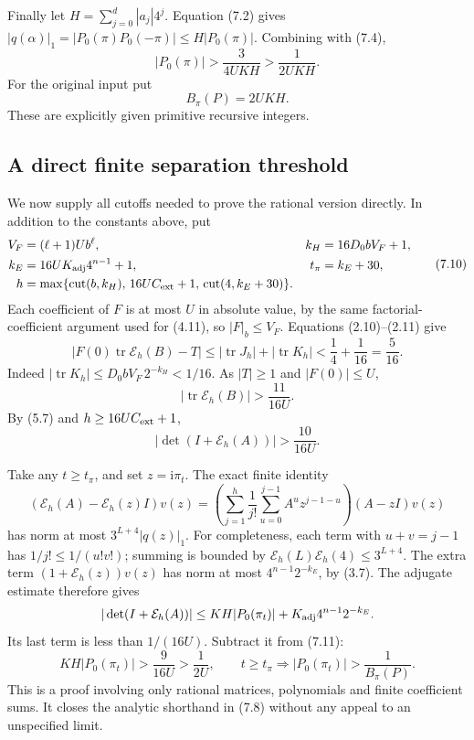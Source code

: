 \documentclass[11pt]{article}
\theoremstyle{definition}
\newcommand{\ii}{\mathrm i}
\newcommand{\tr}{\operatorname{tr}}
\newcommand{\Exp}{\mathcal E}
\newcommand{\cut}{\operatorname{cut}}
\begin{document}
Finally let \(H=\sum_{j=0}^d|a_j|4^j\).
Equation (7.2) gives
\(|q(\alpha)|_1=|P_0(\pi)P_0(-\pi)|\le H|P_0(\pi)|\).
Combining with (7.4),
\[
 |P_0(\pi)|>\frac{3}{4UKH}>\frac1{2UKH}.
 \tag{7.8}
\]
For the original input put
\[
 \boxed{B_\pi(P)=2UKH}. \tag{7.9}
\]
These are explicitly given primitive recursive integers.

\subsection{A direct finite separation threshold}\label{sec:pi-finite}

We now supply all cutoffs needed to prove the rational version directly.
In addition to the constants above, put
\[
 \begin{aligned}
 V_F&=(\ell+1)U b^\ell,&
 k_H&=16D_0bV_F+1,\\
 k_E&=16U K_{\rm adj}4^{n-1}+1,&
 t_\pi&=k_E+30,\\
 h&=\max\{\cut(b,k_H),\,16UC_{\rm ext}+1,\,
                       \cut(4,k_E+30)\}.
 \end{aligned} \tag{7.10}
\]
Each coefficient of \(F\) is at most \(U\) in absolute value, by the
same factorial-coefficient argument used for (4.11), so
\(|F|_b\le V_F\).
Equations (2.10)--(2.11) give
\[
 |F(0)\tr\Exp_h(B)-T|
 \le|\tr J_h|+|\tr K_h|
 <\frac14+\frac1{16}=\frac5{16}.
\]
Indeed \(|\tr K_h|\le D_0bV_F\,2^{-k_H}<1/16\).
As \(|T|\ge1\) and \(|F(0)|\le U\),
\[
 |\tr\Exp_h(B)|>\frac{11}{16U}.
\]
By (5.7) and \(h\ge16UC_{\rm ext}+1\),
\[
 |\det(I+\Exp_h(A))|>\frac{10}{16U}. \tag{7.11}
\]

Take any \(t\ge t_\pi\), and set \(z=\ii\pi_t\).
The exact finite identity
\[
 (\Exp_h(A)-\Exp_h(z)I)v(z)
 =\left(\sum_{j=1}^h\frac1{j!}
                    \sum_{u=0}^{j-1}A^uz^{j-1-u}\right)
                    (A-zI)v(z)
 \tag{7.12}
\]
has norm at most \(3^{L+4}|q(z)|_1\).
For completeness, each term with \(u+v=j-1\) has
\(1/j!\le1/(u!v!)\); summing is bounded by
\(\Exp_h(L)\Exp_h(4)\le3^{L+4}\).
The extra term \((1+\Exp_h(z))v(z)\) has norm at most
\(4^{n-1}2^{-k_E}\), by (3.7).
The adjugate estimate therefore gives
\[
 |\det(I+\Exp_h(A))|
 \le K H|P_0(\pi_t)|+K_{\rm adj}4^{n-1}2^{-k_E}.
\]
Its last term is less than \(1/(16U)\).
Subtract it from (7.11):
\[
 KH|P_0(\pi_t)|>\frac9{16U}>\frac1{2U},
 \qquad
 t\ge t_\pi\Longrightarrow
 |P_0(\pi_t)|>\frac1{B_\pi(P)}.
 \tag{7.13}
\]
This is a proof involving only rational matrices, polynomials and
finite coefficient sums. It closes the analytic shorthand in (7.8)
without any appeal to an unspecified limit.
\end{document}
